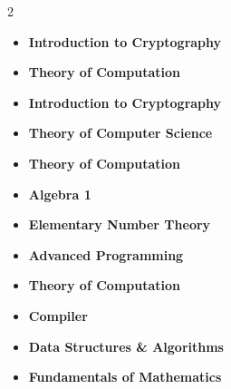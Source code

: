 \vspace{-10pt}
\begin{multicols}{2}
  \begin{itemize}[leftmargin=0.9em, itemsep=0.5pt, parsep=0pt, topsep=0pt, label={}]
    \item {\fontsize{8pt}{9pt}\selectfont \textbf{Introduction to Cryptography} \textbar\  \hfill {}}
    \item {\fontsize{8pt}{9pt}\selectfont \textbf{Theory of Computation} \textbar\  \hfill {}}
    \item {\fontsize{8pt}{9pt}\selectfont \textbf{Introduction to Cryptography} \textbar\  \hfill {}}
    \item {\fontsize{8pt}{9pt}\selectfont \textbf{Theory of Computer Science} \textbar\  \hfill {}}
    \item {\fontsize{8pt}{9pt}\selectfont \textbf{Theory of Computation} \textbar\  \hfill {}}
    \item {\fontsize{8pt}{9pt}\selectfont \textbf{Algebra 1} \textbar\  \hfill {}}
    \item {\fontsize{8pt}{9pt}\selectfont \textbf{Elementary Number Theory} \textbar\  \hfill {}}
    \item {\fontsize{8pt}{9pt}\selectfont \textbf{Advanced Programming} \textbar\  \hfill {}}
    \item {\fontsize{8pt}{9pt}\selectfont \textbf{Theory of Computation} \textbar\  \hfill {}}
    \item {\fontsize{8pt}{9pt}\selectfont \textbf{Compiler} \textbar\  \hfill {}}
    \item {\fontsize{8pt}{9pt}\selectfont \textbf{Data Structures \& Algorithms} \textbar\  \hfill {}}
    \item {\fontsize{8pt}{9pt}\selectfont \textbf{Fundamentals of Mathematics} \textbar\  \hfill {}}

\end{itemize}
\end{multicols}
